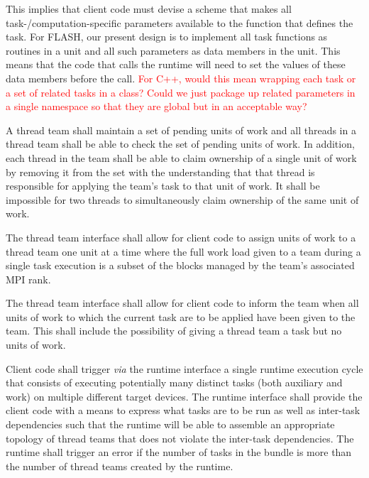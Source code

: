 \documentclass{article}
\begin{document}
This implies that client code must devise a scheme that makes all
task-/computation-specific parameters available to the function that defines the
task.  For FLASH, our present design is to implement all task functions as
routines in a unit and all such parameters as data members in the unit.  This
means that the code that calls the runtime will need to set the values of these
data members before the call.  \textcolor{red}{For C++, would this mean wrapping
each task or a set of related tasks in a class?  Could we just package up
related parameters in a single namespace so that they are global but in an
acceptable way?}

\begin{req}
A thread team shall maintain a set of pending units of work and all threads in a
thread team shall be able to check the set of pending units of work.  In
addition, each thread in the team shall be able to claim ownership of a single
unit of work by removing it from the set with the understanding that that thread
is responsible for applying the team's task to that unit of work.  It shall be
impossible for two threads to simultaneously claim ownership of the same unit of
work.
\end{req}

\begin{req}
The thread team interface shall allow for client code to assign units of
work to a thread team one unit at a time where the full work load given to a
team during a single task execution is a subset of the blocks managed by the
team's associated MPI rank.
\end{req}

\begin{req}
The thread team interface shall allow for client code to inform the team when
all units of work to which the current task are to be applied have been given to
the team.  This shall include the possibility of giving a thread team a task but
no units of work.
\end{req}

\begin{req}
Client code shall trigger \textit{via} the runtime interface a single runtime
execution cycle that consists of executing potentially many distinct tasks (both
auxiliary and work) on multiple different target devices.  The runtime interface
shall provide the client code with a means to express what tasks are to be run
as well as inter-task dependencies such that the runtime will be able to
assemble an appropriate topology of thread teams that does not violate the
inter-task dependencies.  The runtime shall trigger an error if the number of
tasks in the bundle is more than the number of thread teams created by the
runtime.
\end{req}
\end{document}
